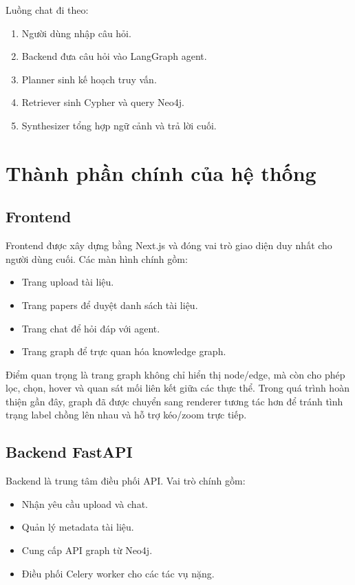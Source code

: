 \documentclass[12pt,a4paper]{article}
\begin{document}
Luồng chat đi theo:
\begin{enumerate}[leftmargin=1.6em]
  \item Người dùng nhập câu hỏi.
  \item Backend đưa câu hỏi vào LangGraph agent.
  \item Planner sinh kế hoạch truy vấn.
  \item Retriever sinh Cypher và query Neo4j.
  \item Synthesizer tổng hợp ngữ cảnh và trả lời cuối.
\end{enumerate}

\section{Thành phần chính của hệ thống}
\subsection{Frontend}
Frontend được xây dựng bằng Next.js và đóng vai trò giao diện duy nhất cho người dùng cuối. Các màn hình chính gồm:
\begin{itemize}[leftmargin=1.6em]
  \item Trang upload tài liệu.
  \item Trang papers để duyệt danh sách tài liệu.
  \item Trang chat để hỏi đáp với agent.
  \item Trang graph để trực quan hóa knowledge graph.
\end{itemize}

Điểm quan trọng là trang graph không chỉ hiển thị node/edge, mà còn cho phép lọc, chọn, hover và quan sát mối liên kết giữa các thực thể. Trong quá trình hoàn thiện gần đây, graph đã được chuyển sang renderer tương tác hơn để tránh tình trạng label chồng lên nhau và hỗ trợ kéo/zoom trực tiếp.

\subsection{Backend FastAPI}
Backend là trung tâm điều phối API. Vai trò chính gồm:
\begin{itemize}[leftmargin=1.6em]
  \item Nhận yêu cầu upload và chat.
  \item Quản lý metadata tài liệu.
  \item Cung cấp API graph từ Neo4j.
  \item Điều phối Celery worker cho các tác vụ nặng.
\end{itemize}
\end{document}
